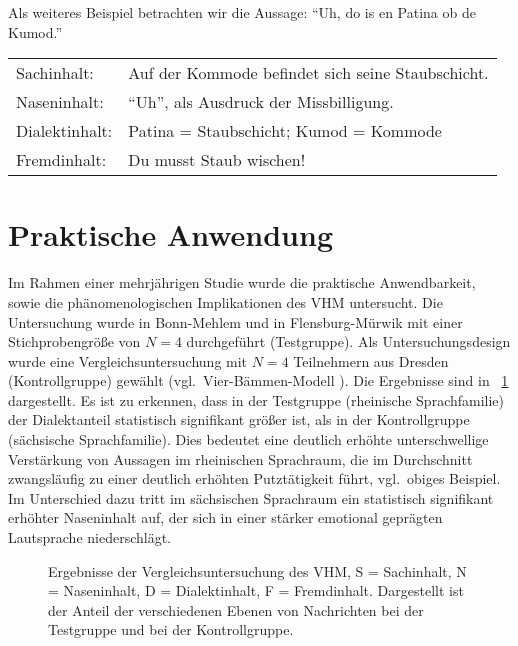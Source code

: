 \documentclass[11pt,DIV16,twocolumn]{scrartcl}
\begin{document}
%
Als weiteres Beispiel betrachten wir die Aussage: "`Uh, do is en
Patina ob de Kumod."'
%
\begin{center}
  \begin{tabularx}{\linewidth}{lX}
    Sachinhalt: & Auf der Kommode befindet sich seine Staubschicht. \\
    Naseninhalt: & "`Uh"', als Ausdruck der Missbilligung. \\
    Dialektinhalt: & Patina = Staubschicht; Kumod = Kommode \\
    Fremdinhalt: & Du musst Staub wischen!
  \end{tabularx}
\end{center}

\section{Praktische Anwendung}

Im Rahmen einer mehrjährigen Studie wurde die praktische
Anwendbarkeit, sowie die phänomenologischen Implikationen des VHM
untersucht.  Die Untersuchung wurde in Bonn-Mehlem und in
Flensburg-Mürwik mit einer Stichprobengröße von $N=4$ durchgeführt
(Testgruppe).  Als Untersuchungsdesign wurde eine
Vergleichsuntersuchung mit $N=4$ Teilnehmern aus Dresden
(Kontrollgruppe) gewählt (vgl.\ Vier-Bämmen-Modell \cite{VBM}).  Die
Ergebnisse sind in \figurename~\ref{fig:VHM} dargestellt.  Es ist zu
erkennen, dass in der Testgruppe (rheinische Sprachfamilie) der
Dialektanteil statistisch signifikant größer ist, als in der
Kontrollgruppe (sächsische Sprachfamilie).  Dies bedeutet eine
deutlich erhöhte unterschwellige Verstärkung von Aussagen im
rheinischen Sprachraum, die im Durchschnitt zwangsläufig zu einer
deutlich erhöhten Putztätigkeit führt, vgl.\ obiges Beispiel.  Im
Unterschied dazu tritt im sächsischen Sprachraum ein statistisch
signifikant erhöhter Naseninhalt auf, der sich in einer stärker
emotional geprägten Lautsprache niederschlägt.

\begin{figure}[tb]
  \centering
  \caption{Ergebnisse der Vergleichsuntersuchung des VHM, S =
    Sachinhalt, N = Naseninhalt, D = Dialektinhalt, F = Fremdinhalt.
    Dargestellt ist der Anteil der verschiedenen Ebenen von
    Nachrichten bei der Testgruppe und bei der Kontrollgruppe.}
  \label{fig:VHM}
\end{figure}
\end{document}
